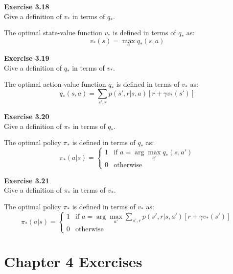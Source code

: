 \documentclass[addpoints]{exam}
\begin{document}
\begin{questions}
    \question
    \textbf{Exercise 3.18} \\ Give a definition of \( v_* \) in terms of \( q_* \).
    \begin{solution}
        The optimal state-value function \( v_* \) is defined in terms of \( q_* \) as:
        \[
        v_*(s) = \max_{a} q_*(s, a)
        \]
    \end{solution}

    \question
    \textbf{Exercise 3.19} \\ Give a definition of \( q_* \) in terms of \( v_* \).
    \begin{solution}
        The optimal action-value function \( q_* \) is defined in terms of \( v_* \) as:
        \[
        q_*(s, a) = \sum_{s', r} p(s', r | s, a) \left[ r + \gamma v_*(s') \right]
        \]
    \end{solution}

    \question
    \textbf{Exercise 3.20} \\ Give a definition of \( \pi_* \) in terms of \( q_* \).
    \begin{solution}
        The optimal policy \( \pi_* \) is defined in terms of \( q_* \) as:
        \[
        \pi_*(a | s) = \begin{cases}
        1 & \text{if } a = \arg\max_{a'} q_*(s, a') \\
        0 & \text{otherwise}
        \end{cases}
        \]
    \end{solution}

    \question
    \textbf{Exercise 3.21} \\ Give a definition of \( \pi_* \) in terms of \( v_* \).
    \begin{solution}
        The optimal policy \( \pi_* \) is defined in terms of \( v_* \) as:
        \[
        \pi_*(a | s) = \begin{cases}
        1 & \text{if } a = \arg\max_{a'} \sum_{s', r} p(s', r | s, a') \left[ r + \gamma v_*(s') \right] \\
        0 & \text{otherwise}
        \end{cases}
        \]
    \end{solution}
\end{questions}

\section*{Chapter 4 Exercises}
\end{document}
